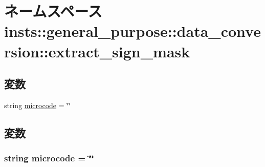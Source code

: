 \hypertarget{namespaceinsts_1_1general__purpose_1_1data__conversion_1_1extract__sign__mask}{
\section{ネームスペース insts::general\_\-purpose::data\_\-conversion::extract\_\-sign\_\-mask}
\label{namespaceinsts_1_1general__purpose_1_1data__conversion_1_1extract__sign__mask}
}
\subsection*{変数}
\begin{DoxyCompactItemize}
\item 
string \hyperlink{namespaceinsts_1_1general__purpose_1_1data__conversion_1_1extract__sign__mask_a770f11a173e99389a8802f0107ed8f52}{microcode} = \char`\"{}\char`\"{}
\end{DoxyCompactItemize}


\subsection{変数}
\hypertarget{namespaceinsts_1_1general__purpose_1_1data__conversion_1_1extract__sign__mask_a770f11a173e99389a8802f0107ed8f52}{
\subsubsection[{microcode}]{\setlength{\rightskip}{0pt plus 5cm}string {\bf microcode} = \char`\"{}\char`\"{}}}
\label{namespaceinsts_1_1general__purpose_1_1data__conversion_1_1extract__sign__mask_a770f11a173e99389a8802f0107ed8f52}
